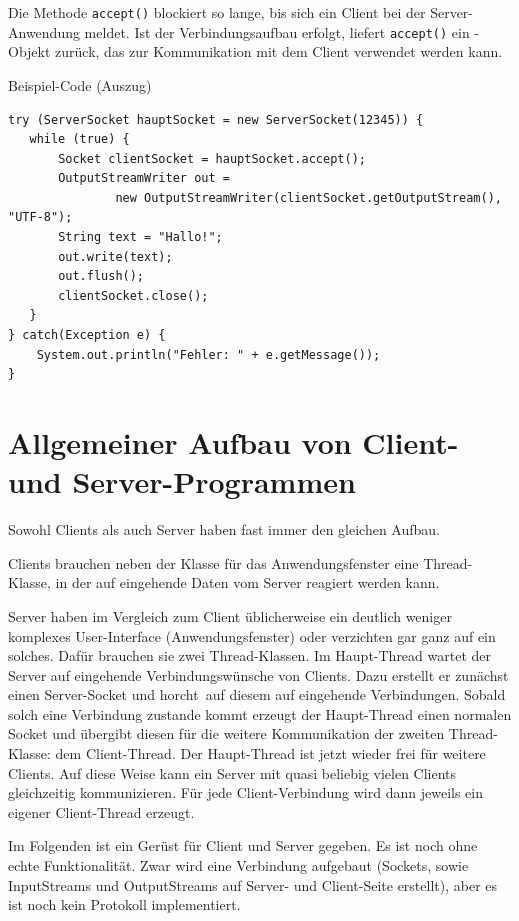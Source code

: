 Die Methode \lstinline|accept()| blockiert so lange, bis sich ein Client bei der
Server-Anwendung meldet. Ist der Verbindungsaufbau erfolgt, liefert
\lstinline|accept()| ein -Objekt zurück, das zur
Kommunikation mit dem Client verwendet werden kann.

Beispiel-Code (Auszug)

\begin{lstlisting}
try (ServerSocket hauptSocket = new ServerSocket(12345)) {
   while (true) {
       Socket clientSocket = hauptSocket.accept();
       OutputStreamWriter out = 
               new OutputStreamWriter(clientSocket.getOutputStream(), "UTF-8");
       String text = "Hallo!";
       out.write(text);
       out.flush();
       clientSocket.close();
   }
} catch(Exception e) {
    System.out.println("Fehler: " + e.getMessage());
}
\end{lstlisting}


\section{Allgemeiner Aufbau von Client- und Server-Programmen}

Sowohl Clients als auch Server haben fast immer den gleichen Aufbau. 

\begin{compactitem}
\item Clients brauchen neben der Klasse für das Anwendungsfenster eine
Thread-Klasse, in der auf eingehende Daten vom Server reagiert werden kann.

\item Server haben im Vergleich zum Client üblicherweise ein deutlich weniger
komplexes User-Interface (Anwendungsfenster) oder verzichten gar ganz auf ein
solches. Dafür brauchen sie zwei Thread-Klassen. Im Haupt-Thread wartet der
Server auf eingehende Verbindungswünsche von Clients. Dazu erstellt er zunächst
einen Server-Socket und \glqq horcht\grqq\ auf diesem auf eingehende
Verbindungen. Sobald solch eine Verbindung zustande kommt erzeugt der
Haupt-Thread einen normalen Socket und übergibt diesen für die weitere
Kommunikation der zweiten Thread-Klasse: dem Client-Thread. Der Haupt-Thread
ist jetzt wieder frei für weitere Clients. Auf diese Weise kann ein Server mit
quasi beliebig vielen Clients gleichzeitig kommunizieren. Für jede
Client-Verbindung wird dann jeweils ein eigener Client-Thread erzeugt.
\end{compactitem}

Im Folgenden ist ein Gerüst für Client und Server gegeben. Es ist noch ohne
echte Funktionalität. Zwar wird eine Verbindung aufgebaut (Sockets, sowie
InputStreams und OutputStreams auf Server- und Client-Seite erstellt), aber es
ist noch kein Protokoll implementiert.

